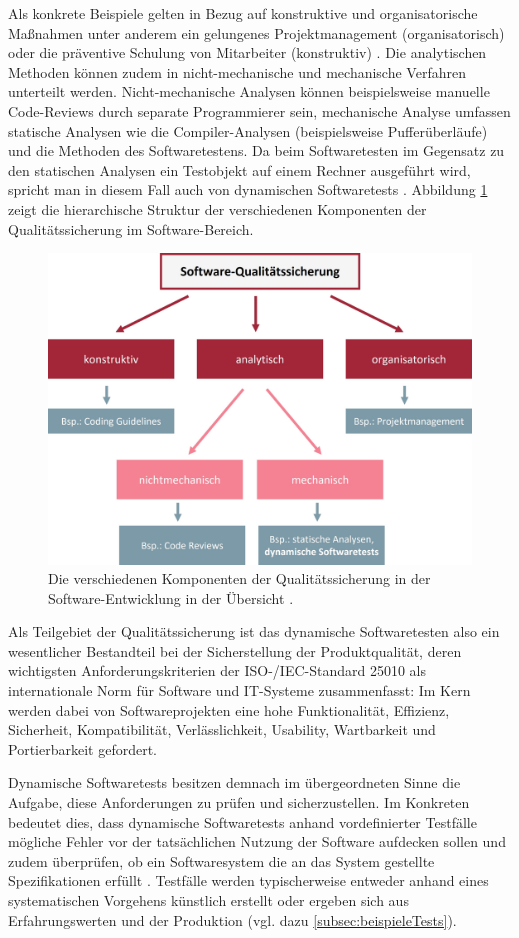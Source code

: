 Als konkrete Beispiele gelten in Bezug auf konstruktive und organisatorische Maßnahmen unter anderem ein gelungenes Projektmanagement (organisatorisch) oder die präventive Schulung von Mitarbeiter (konstruktiv) \cite[S. 272]{ludewig2010software}. Die analytischen Methoden können zudem in nicht-mechanische und mechanische Verfahren unterteilt werden. Nicht-mechanische Analysen können beispielsweise manuelle Code-Reviews durch separate Programmierer sein, mechanische Analyse umfassen statische Analysen wie die Compiler-Analysen (beispielsweise Pufferüberläufe) und die Methoden des Softwaretestens. Da beim Softwaretesten im Gegensatz zu den statischen Analysen ein Testobjekt auf einem Rechner ausgeführt wird, spricht man in diesem Fall auch von dynamischen Softwaretests \cite[S. 135]{spillner2010basiswissen}. Abbildung \ref{fig:qualitaetssicherung} zeigt die hierarchische Struktur der verschiedenen Komponenten der Qualitätssicherung im Software-Bereich.

\begin{figure}[!h]
\centering
\includegraphics[width=0.5\columnwidth]{images/Qualitaetssicherung_Uebersicht.jpg}
\caption{Die verschiedenen Komponenten der Qualitätssicherung in der Software-Entwicklung in der Übersicht \cite[S. 271]{ludewig2010software}.}
\label{fig:qualitaetssicherung}
\end{figure}


Als Teilgebiet der Qualitätssicherung ist das dynamische Softwaretesten also ein wesentlicher Bestandteil bei der Sicherstellung der Produktqualität, deren wichtigsten Anforderungskriterien der ISO-/IEC-Standard 25010 \cite{ISO25010} als internationale Norm für Software und IT-Systeme zusammenfasst: Im Kern werden dabei von Softwareprojekten eine hohe Funktionalität, Effizienz, Sicherheit, Kompatibilität, Verlässlichkeit, Usability, Wartbarkeit und Portierbarkeit gefordert.

Dynamische Softwaretests besitzen demnach im übergeordneten Sinne die Aufgabe, diese Anforderungen zu prüfen und sicherzustellen. Im Konkreten bedeutet dies, dass dynamische Softwaretests anhand vordefinierter Testfälle mögliche Fehler vor der tatsächlichen Nutzung der Software aufdecken sollen und zudem überprüfen, ob ein Softwaresystem die an das System gestellte Spezifikationen erfüllt \cite[S. 246]{sommerville2012software-engineering}. Testfälle werden typischerweise entweder anhand eines systematischen Vorgehens künstlich erstellt oder ergeben sich aus Erfahrungswerten und der Produktion (vgl. dazu \autoref{subsec:beispieleTests}).  

